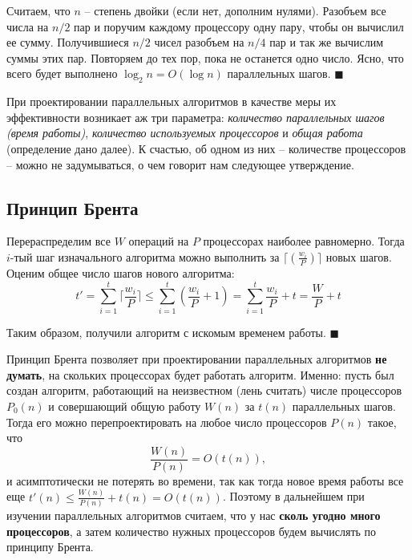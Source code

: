  Считаем, что $n$ -- степень двойки (если нет, дополним нулями).  Разобъем все числа на $n/2$ пар и поручим каждому процессору одну пару, чтобы он вычислил ее сумму. Получившиеся $n/2$ чисел разобъем на $n/4$ пар и так же вычислим суммы этих пар. Повторяем до тех пор, пока не останется одно число. Ясно, что всего будет выполнено $\log_2 n = O(\log n)$ параллельных шагов. $\blacksquare$

При проектировании параллельных алгоритмов в качестве меры их эффективности возникает аж три параметра: \textit{количество параллельных шагов (время работы)}, \textit{количество используемых процессоров} и \textit{общая работа} (определение дано далее). К счастью, об одном из них -- количестве процессоров -- можно не задумываться, о чем говорит нам следующее утверждение.

\subsection{Принцип Брента}

 Перераспределим все $W$ операций на $P$ процессорах наиболее равномерно. Тогда $i$-тый шаг изначального алгоритма можно выполнить за $\lceil(\frac{w_i}{P})\rceil$ новых шагов. Оценим общее число шагов нового алгоритма:
$$t' = \sum_{i=1}^t \lceil\frac{w_i}{P}\rceil \leq \sum_{i=1}^t (\frac{w_i}{P} + 1) = \sum_{i=1}^t \frac{w_i}{P} + t = \frac{W}{P} + t$$

Таким образом, получили алгоритм с искомым временем работы. $\blacksquare$

 Принцип Брента позволяет при проектировании параллельных алгоритмов \textbf{не думать}, на скольких процессорах будет работать алгоритм. Именно: пусть был создан алгоритм, работающий на неизвестном (лень считать) числе процессоров $P_0(n)$ и совершающий общую работу $W(n)$ за $t(n)$ параллельных шагов. Тогда его можно перепроектировать на любое число процессоров $P(n)$ такое, что $$\frac{W(n)}{P(n)} = O(t(n)),$$ и асимптотически не потерять во времени, так как тогда новое время работы все еще $t'(n) \leq \frac{W(n)}{P(n)} + t(n) = O(t(n))$. Поэтому в дальнейшем при изучении параллельных алгоритмов считаем, что у нас \textbf{сколь угодно много процессоров}, а затем количество нужных процессоров будем вычислять по принципу Брента.

